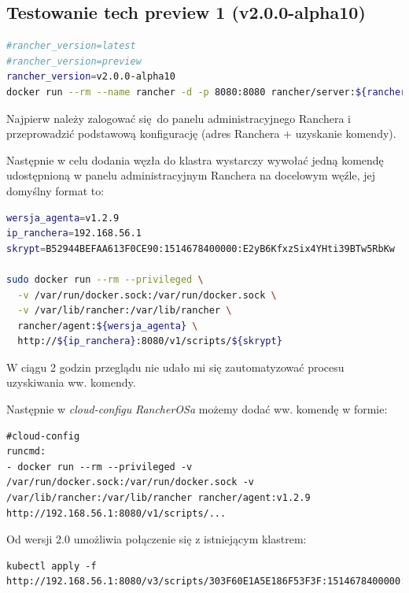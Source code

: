 \documentclass[a4paper,12pt,twoside,openany]{report}
\begin{document}
\hypertarget{testowanie-tech-preview-1-v2.0.0-alpha10}{%
\subsection{Testowanie tech preview 1
(v2.0.0-alpha10)}\label{testowanie-tech-preview-1-v2.0.0-alpha10}}

\begin{lstlisting}[language=bash]
#rancher_version=latest
#rancher_version=preview
rancher_version=v2.0.0-alpha10
docker run --rm --name rancher -d -p 8080:8080 rancher/server:${rancher_version}
\end{lstlisting}

Najpierw należy zalogować się~do panelu administracyjnego Ranchera i
przeprowadzić podstawową konfigurację (adres Ranchera + uzyskanie
komendy).

Następnie w celu dodania węzła do klastra wystarczy wywołać jedną
komendę~ udostępnioną w panelu administracyjnym Ranchera na docelowym
węźle, jej domyślny format to:

\begin{lstlisting}[language=bash]
wersja_agenta=v1.2.9
ip_ranchera=192.168.56.1
skrypt=B52944BEFAA613F0CE90:1514678400000:E2yB6KfxzSix4YHti39BTw5RbKw

sudo docker run --rm --privileged \
  -v /var/run/docker.sock:/var/run/docker.sock \
  -v /var/lib/rancher:/var/lib/rancher \
  rancher/agent:${wersja_agenta} \
  http://${ip_ranchera}:8080/v1/scripts/${skrypt}
\end{lstlisting}

W ciągu 2 godzin przeglądu nie udało mi się zautomatyzować procesu
uzyskiwania ww. komendy.

Następnie w \emph{cloud-configu} \emph{RancherOSa} możemy dodać ww.
komendę w formie:

\begin{lstlisting}
#cloud-config
runcmd:
- docker run --rm --privileged -v /var/run/docker.sock:/var/run/docker.sock -v /var/lib/rancher:/var/lib/rancher rancher/agent:v1.2.9 http://192.168.56.1:8080/v1/scripts/...
\end{lstlisting}

Od wersji 2.0 umożliwia połączenie się z istniejącym klastrem:

\begin{lstlisting}
kubectl apply -f http://192.168.56.1:8080/v3/scripts/303F60E1A5E186F53F3F:1514678400000:wstQFdHpOgHqKahoYdmsCXEWMW4.yaml
\end{lstlisting}
\end{document}
